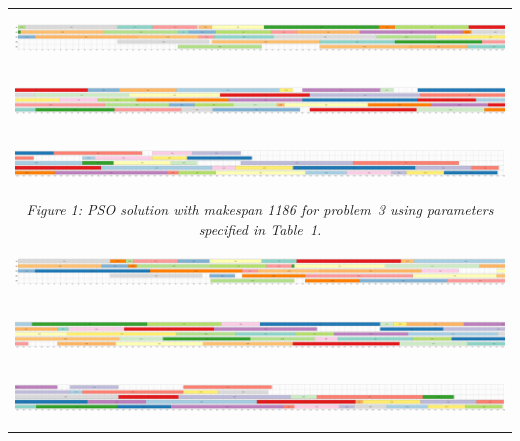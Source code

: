 \documentclass[paper=a4, fontsize=9pt]{scrartcl}
\begin{document}
\begin{landscape}


{
\begin{table}
\hspace*{-0.5cm}
\centering
\begin{tabular}{l}
\includegraphics[height=40pt]{figures/solution_pso_instance_3_1_scaled}\\[0.15cm]
\hspace{0.90909pt}\includegraphics[height=40pt]{figures/solution_pso_instance_3_2_scaled}\\[0.15cm]
\hspace{0.90909pt}\includegraphics[height=40pt]{figures/solution_pso_instance_3_3_scaled}\\
\multicolumn{1}{c}{\textit{Figure 1: \acf{PSO} solution with makespan 1186 for problem~3 using parameters specified in Table~1.}}\\[1.2cm]
\includegraphics[height=40pt]{figures/solution_aco_instance_3_1_scaled}\\[0.15cm]
\hspace{0.90909pt}\includegraphics[height=40pt]{figures/solution_aco_instance_3_2_scaled}\\[0.15cm]
\hspace{0.90909pt}\includegraphics[height=40pt]{figures/solution_aco_instance_3_3_scaled}\\

\end{tabular}
\end{table}}
\end{landscape}
\end{document}
